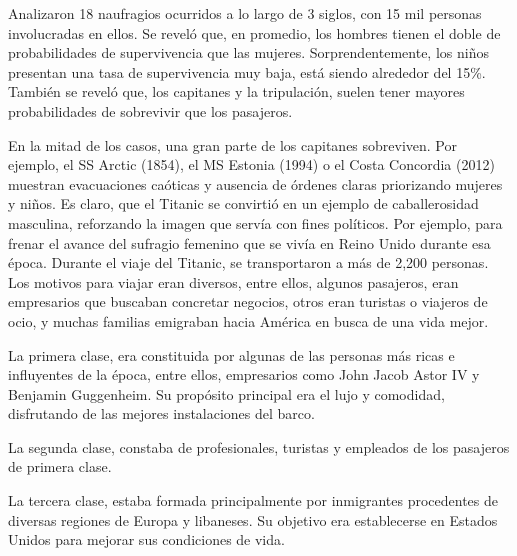 \documentclass[sjournal]{IEEEtran}
\begin{document}
Analizaron 18 naufragios ocurridos a lo largo de 3 siglos, con 15 mil personas involucradas en ellos. Se reveló que, en promedio, los hombres tienen el doble de probabilidades de supervivencia que las mujeres. Sorprendentemente, los niños presentan una tasa de supervivencia muy baja, está siendo alrededor del 15\%. También se reveló que, los capitanes y la tripulación, suelen tener mayores probabilidades de sobrevivir que los pasajeros. 

En la mitad de los casos, una gran parte de los capitanes sobreviven. Por ejemplo, el SS Arctic (1854), el MS Estonia (1994) o el Costa Concordia (2012) muestran evacuaciones caóticas y ausencia de órdenes claras priorizando mujeres y niños. Es claro, que el Titanic se convirtió en un ejemplo de caballerosidad masculina, reforzando la imagen que servía con fines políticos. Por ejemplo, para frenar el avance del sufragio femenino que se vivía en Reino Unido durante esa época. Durante el viaje del Titanic, se transportaron a más de 2,200 personas. Los motivos para viajar eran diversos, entre ellos, algunos pasajeros, eran empresarios que buscaban concretar negocios, otros eran turistas o viajeros de ocio, y muchas familias emigraban hacia América en busca de una vida mejor.

La primera clase, era constituida por algunas de las personas más ricas e influyentes de la época, entre ellos, empresarios como John Jacob Astor IV y Benjamin Guggenheim. Su propósito principal era el lujo y comodidad, disfrutando de las mejores instalaciones del barco.

La segunda clase, constaba de profesionales, turistas y empleados de los pasajeros de primera clase.

La tercera clase, estaba formada principalmente por inmigrantes procedentes de diversas regiones de Europa y libaneses. Su objetivo era establecerse en Estados Unidos para mejorar sus condiciones de vida.
\end{document}
